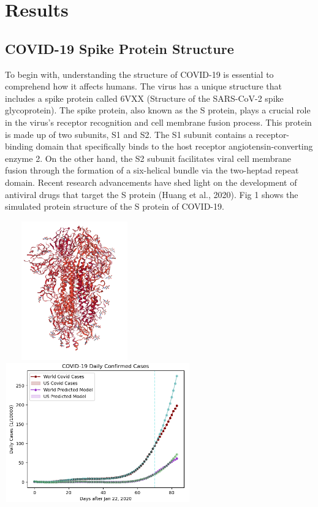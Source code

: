\section{Results} \label{subm}
\subsection{COVID-19 Spike Protein Structure}
\hspace{5mm} To begin with, understanding the structure of COVID-19 is essential to comprehend how it affects humans. The virus has a unique structure that includes a spike protein called 6VXX (Structure of the SARS-CoV-2 spike glycoprotein). The spike protein, also known as the S protein, plays a crucial role in the virus's receptor recognition and cell membrane fusion process. This protein is made up of two subunits, S1 and S2. The S1 subunit contains a receptor-binding domain that specifically binds to the host receptor angiotensin-converting enzyme 2. On the other hand, the S2 subunit facilitates viral cell membrane fusion through the formation of a six-helical bundle via the two-heptad repeat domain. Recent research advancements have shed light on the development of antiviral drugs that target the S protein (Huang et al., 2020). Fig 1 shows the simulated protein structure of the S protein of COVID-19.

\vspace{5mm}

\includegraphics[width=6cm, height=6cm]{img/spike.png} 
\hspace{5mm}
\includegraphics[width=8cm, height=6cm]{img/COVID19_confirmed.png}

